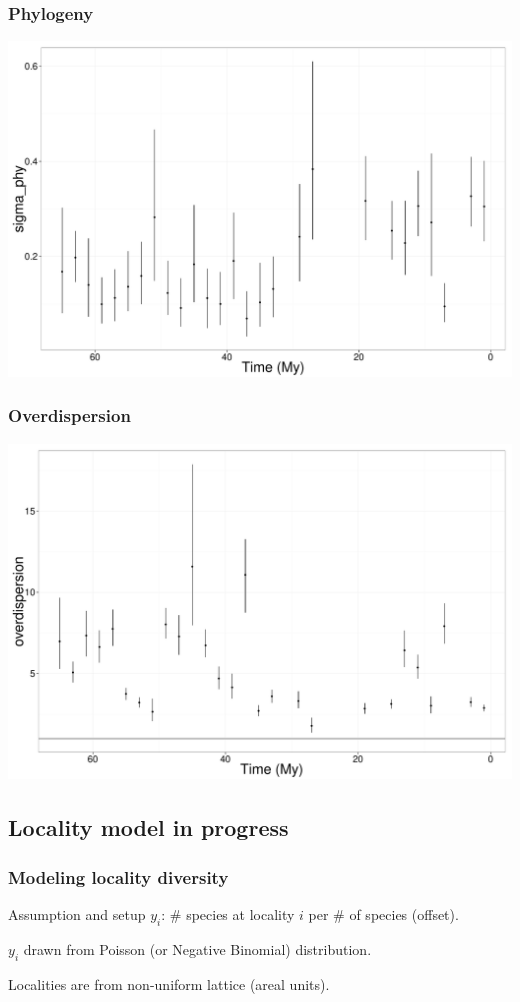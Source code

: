 \documentclass{beamer}
\begin{document}
\begin{frame}
  \frametitle{Phylogeny}
  \begin{center}
    \includegraphics[height = 0.8\textheight, width = \textwidth,  keepaspectratio = true]{figure/phy_est_time}
  \end{center}
\end{frame}

\begin{frame}
  \frametitle{Overdispersion}
  \begin{center}
    \includegraphics[height = 0.8\textheight, width = \textwidth,  keepaspectratio = true]{figure/over_est_time}
  \end{center}
\end{frame}


\subsection{Locality model in progress}
\begin{frame}
  \frametitle{Modeling locality diversity}
  \begin{alertblock}{Assumption and setup}
    \(y_{i}\): \# species at locality \(i\) per \# of species (offset).

    \(y_{i}\) drawn from Poisson (or Negative Binomial) distribution.

    Localities are from non-uniform lattice (areal units).
  \end{alertblock}
\end{frame}
\end{document}
